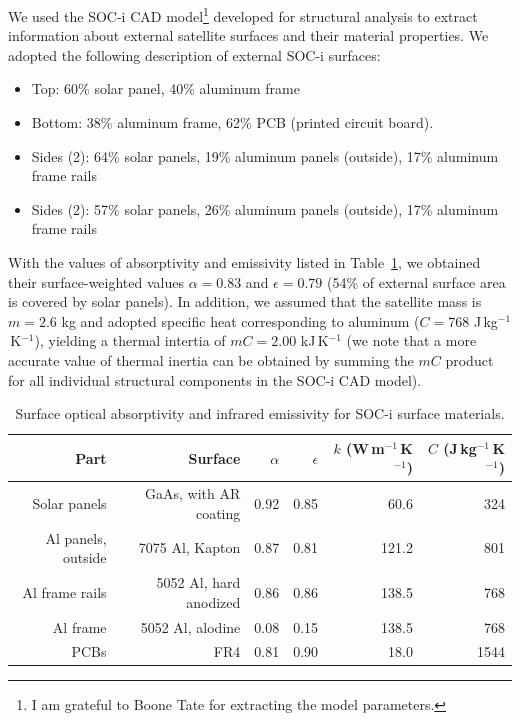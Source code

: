 \documentclass[]{aastex62}
\begin{document}
We used the SOC-i CAD model\footnote{I am grateful to Boone Tate for extracting the model parameters.} 
developed for structural analysis to extract information about
external satellite surfaces and their material properties. We adopted the following description 
of external SOC-i surfaces: 
\begin{itemize}
\item  Top: 60\% solar panel, 40\% aluminum frame
\item  Bottom: 38\% aluminum frame, 62\% PCB (printed circuit board). 
\item  Sides (2): 64\% solar panels, 19\% aluminum panels (outside), 17\% aluminum frame rails
\item  Sides (2): 57\% solar panels, 26\% aluminum panels (outside), 17\% aluminum frame rails
\end{itemize}

With the values of absorptivity and emissivity listed in Table~\ref{tab:inputsAbsEmiss}, we obtained
their surface-weighted values $\alpha=0.83$ and $\epsilon=0.79$ (54\% of external surface area
is covered by solar panels). In addition, we assumed that the satellite mass is $m=2.6$ kg and 
adopted specific heat corresponding to aluminum ($C=768$  J\,kg$^{-1}$\,K$^{-1}$), yielding a
thermal intertia of $mC = 2.00$ kJ\,K$^{-1}$ (we note that a more accurate value of thermal inertia 
can be obtained by summing the $mC$ product for all individual structural components
in the SOC-i CAD model). 

\begin{table}[t]
	\centering
	\caption{Surface optical absorptivity and infrared emissivity for SOC-i surface materials. }
	\label{tab:inputsAbsEmiss}
	\begin{tabular}{r|r|r|r|r|r} %
		\hline
  	              Part        &                Surface          &    $\alpha$  &   $\epsilon$    &   $k$ (W\,m$^{-1}$\,K$^{-1}$)   &  $C$ (J\,kg$^{-1}$\,K$^{-1}$)  \\
	  	\hline
         Solar panels        &       GaAs, with AR coating  &           0.92      &          0.85      &   60.6    &      324   \\  
     Al panels, outside   &     7075 Al, Kapton             &           0.87       &         0.81       &  121.2   &    801   \\ 
          Al frame rails    &       5052 Al, hard anodized &          0.86        &        0.86      &    138.5   &    768    \\  
                Al frame      &       5052 Al, alodine            &          0.08        &        0.15       &   138.5   &    768    \\
                PCBs            &               FR4                        &           0.81       &         0.90        &   18.0  &    1544  \\ 
 		\hline     
	\end{tabular} 
\end{table}
 
\end{document}
